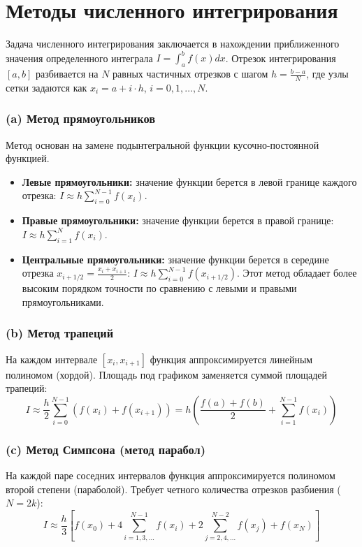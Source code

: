 \documentclass[a4paper]{article}
\begin{document}
\section*{\fontsize{11pt}{0pt}\selectfont\textbf{Методы численного интегрирования}}
Задача численного интегрирования заключается в нахождении приближенного значения определенного интеграла $I = \int_a^b f(x) dx$.
Отрезок интегрирования $[a, b]$ разбивается на $N$ равных частичных отрезков с шагом $h = \frac{b-a}{N}$, где узлы сетки задаются как $x_i = a + i \cdot h$, $i = 0, 1, \dots, N$.

\subsubsection*{(a) Метод прямоугольников}
Метод основан на замене подынтегральной функции кусочно-постоянной функцией.
\begin{itemize}
    \item \textbf{Левые прямоугольники:} значение функции берется в левой границе каждого отрезка: 
    $I \approx h \sum_{i=0}^{N-1} f(x_i)$.
\item \textbf{Правые прямоугольники:} значение функции берется в правой границе: 
    $I \approx h \sum_{i=1}^{N} f(x_i)$.
\item \textbf{Центральные прямоугольники:} значение функции берется в середине отрезка $x_{i+1/2} = \frac{x_i + x_{i+1}}{2}$: 
    $I \approx h \sum_{i=0}^{N-1} f(x_{i+1/2})$.
Этот метод обладает более высоким порядком точности по сравнению с левыми и правыми прямоугольниками.
\end{itemize}

\subsubsection*{(b) Метод трапеций}
На каждом интервале $[x_i, x_{i+1}]$ функция аппроксимируется линейным полиномом (хордой).
Площадь под графиком заменяется суммой площадей трапеций:
$$I \approx \frac{h}{2} \sum_{i=0}^{N-1} (f(x_i) + f(x_{i+1})) = h \left( \frac{f(a)+f(b)}{2} + \sum_{i=1}^{N-1} f(x_i) \right)$$

\subsubsection*{(c) Метод Симпсона (метод парабол)}
На каждой паре соседних интервалов функция аппроксимируется полиномом второй степени (параболой).
Требует четного количества отрезков разбиения ($N = 2k$):
$$I \approx \frac{h}{3} \left[ f(x_0) + 4\sum_{i=1, 3, \dots}^{N-1} f(x_i) + 2\sum_{j=2, 4, \dots}^{N-2} f(x_j) + f(x_N) \right]$$
\end{document}
